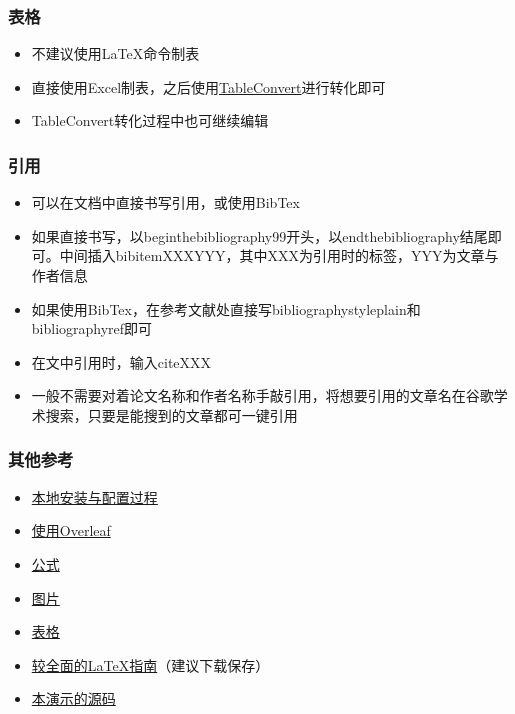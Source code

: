 \documentclass{beamer}
\begin{document}
\begin{frame} 
    \frametitle{表格} 
    \begin{itemize} 
        \item 不建议使用\LaTeX{}命令制表
        \item 直接使用Excel制表，之后使用\href{https://tableconvert.com/}{TableConvert}进行转化即可
        \item TableConvert转化过程中也可继续编辑
    \end{itemize} 
\end{frame}

\begin{frame} 
    \frametitle{引用} 
    \begin{itemize} 
        \item 可以在文档中直接书写引用，或使用BibTex
        \item 如果直接书写，以begin{thebibliography}{99}开头，以end{thebibliography}结尾即可。中间插入bibitem{XXX}YYY，其中XXX为引用时的标签，YYY为文章与作者信息
        \item 如果使用BibTex，在参考文献处直接写bibliographystyle{plain}和bibliography{ref}即可
        \item 在文中引用时，输入cite{XXX}
        \item 一般不需要对着论文名称和作者名称手敲引用，将想要引用的文章名在谷歌学术搜索，只要是能搜到的文章都可一键引用
    \end{itemize} 
\end{frame}

\begin{frame} 
    \frametitle{其他参考} 
    \begin{itemize} 
        \item \href{https://zhuanlan.zhihu.com/p/38178015}{本地安装与配置过程}
        \item \href{https://zhuanlan.zhihu.com/p/67182742}{使用Overleaf}
        \item \href{https://blog.csdn.net/NSJim/article/details/109045914}{公式}
        \item \href{https://blog.csdn.net/qq_31347869/article/details/103832190}{图片}
        \item \href{https://blog.csdn.net/juechenyi/article/details/77116011}{表格}
        \item \href{https://ctan.org/tex-archive/info/lshort/chinese}{较全面的\LaTeX{}指南}（建议下载保存）
        \item \href{https://github.com/MonsTao/WritingPapersWithLatex}{本演示的源码}
    \end{itemize} 
\end{frame}
\end{document}
